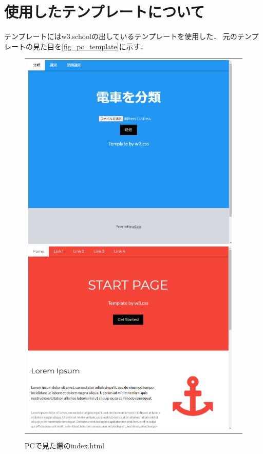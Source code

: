 \section{使用したテンプレートについて}
テンプレートにはw3.schoolの出しているテンプレートを使用した．
元のテンプレートの見た目を\ref{fig_pc_template}に示す．

\begin{figure}[H]
	\begin{tabular}{cc}
		\begin{minipage}[b]{0.45\textwidth}
			\centering
			\includegraphics [width=\linewidth]{chap2/fig/pc_index.png}%
			\caption{PCで見た際のindex.html}	\label{fig_pc_index}
		\end{minipage}	
		\begin{minipage}[b]{0.45\textwidth}
			\centering
			\includegraphics [width=\linewidth]{chap2/fig/pc_template.png}%

\end{minipage}
\end{tabular}
\end{figure}
